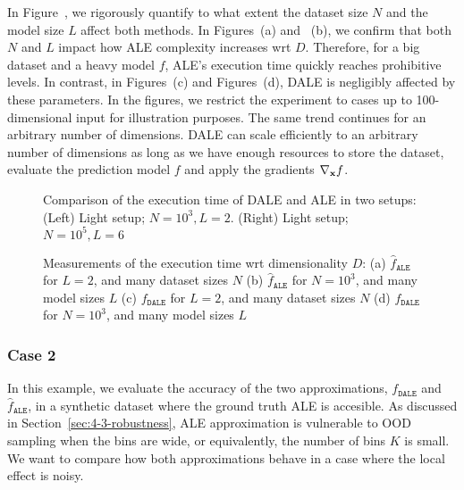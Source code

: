In Figure~, we rigorously quantify to what extent the dataset size \(N\) and the model size \(L\) affect both methods. In Figures~(a) and ~(b), we confirm that both \(N\) and \(L\) impact how ALE complexity increases wrt \(D\). Therefore, for a big dataset and a heavy model \(f\), ALE's execution time quickly reaches prohibitive levels. In contrast, in Figures~(c) and Figures~(d), DALE is negligibly affected by these parameters. In the figures, we restrict the experiment to cases up to 100-dimensional input for illustration purposes. The same trend continues for an arbitrary number of dimensions. DALE can scale efficiently to an arbitrary number of dimensions as long as we have enough resources to store the dataset, evaluate the prediction model \(f\) and apply the gradients \(\nabla_{\mathbf{x}}f\).

\begin{figure}[h]
  \centering
  \resizebox{.4\columnwidth}{!}{}
  \resizebox{.43\columnwidth}{!}{}
  \caption[Example 3]{Comparison of the execution time of DALE
    and ALE in two setups: (Left) Light setup; \(N=10^3, L=2\).
    (Right) Light setup; \(N=10^5, L=6\)}
  \label{fig:case-1-plots-1}
\end{figure}

\begin{figure}[h]
  \centering
  \resizebox{.23\columnwidth}{!}{}
  \resizebox{.23\columnwidth}{!}{}
  \resizebox{.23\columnwidth}{!}{}
  \resizebox{.23\columnwidth}{!}{}
  \caption[Example 3]{Measurements of the execution time wrt dimensionality \(D\):
    (a) \(\hat{f}_{\mathtt{ALE}}\) for \(L = 2\), and many dataset sizes \(N\)
    (b) \(\hat{f}_{\mathtt{ALE}}\) for \(N = 10^3\), and many model sizes \(L\)
    (c) \(f_{\mathtt{DALE}}\) for \(L = 2\), and many dataset sizes \(N\)
    (d) \(f_{\mathtt{DALE}}\) for \(N = 10^3\), and many model sizes \(L\)
  }
  \label{fig:case-1-plots-2}
\end{figure}


\subsubsection{Case 2}
\label{sec:example2}

In this example, we evaluate the accuracy of the two approximations,
\(f_{\mathtt{DALE}}\) and \(\hat{f}_{\mathtt{ALE}}\), in a synthetic
dataset where the ground truth ALE is accesible. As discussed in
Section~\ref{sec:4-3-robustness}, ALE approximation is vulnerable to
OOD sampling when the bins are wide, or equivalently, the number of
bins \(K\) is small. We want to compare how both approximations behave
in a case where the local effect is noisy.

